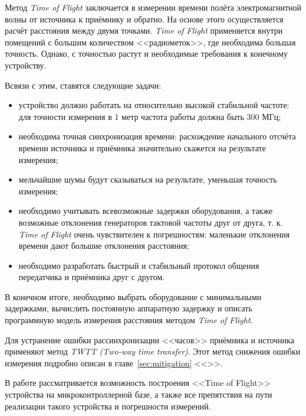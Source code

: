 Метод \textit{Time of Flight} заключается в измерении времени полёта электромагнитной волны от источника к приёмнику и обратно. На основе этого осуществляется расчёт расстояния между двумя точками. \textit{Time of Flight} применяется внутри помещений с большим количеством <<радиометок>>, где необходима большая точность. Однако, с точностью растут и необходимые требования к конечному устройству.

Всвязи с этим, ставятся следующие задачи:

\begin{itemize}
    \item устройство должно работать на относительно высокой стабильной частоте: для точности измерения в 1 метр частота работы должна быть 300 МГц;
    \item необходима точная синхронизация времени: расхождение начального отсчёта времени источника и приёмника значительно скажется на результате измерения;
    \item мельчайшие шумы будут сказываться на результате, уменьшая точность измерения;
    \item необходимо учитывать всевозможные задержки оборудования, а также возможные отклонения генераторов тактовой частоты друг от друга, т. к. \textit{Time of Flight} очень чувствителен к погрешностям: маленькие отклонения времени дают большие отклонения расстояния;
    \item необходимо разработать быстрый и стабильный протокол общения передатчика и приёмника друг с другом.
\end{itemize}

В конечном итоге, необходимо выбрать оборудование с минимальными задержками, вычислить постоянную аппаратную задержку и описать программную модель измерения расстояния методом \textit{Time of Flight}.

Для устранение ошибки рассинхронизации <<часов>> приёмника и источника применяют метод \textit{TWTT (Two-way time transfer)}. Этот метод снижения ошибки измерения подробно описан в главе~\ref{sec:mitigation} <<>>.

В работе рассматривается возможность построения <<Time of Flight>> устройства на микроконтроллерной базе, а также все препятствия на пути реализации такого устройства и погрешности измерений.
